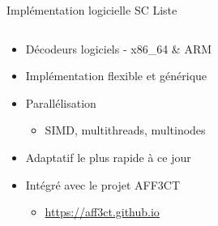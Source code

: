 \documentclass[t,compress,mathserif,12pt,xcolor=dvipsnames]{beamer}
\begin{document}
\begin{frame}[t]{Implémentation logicielle SC Liste}
  \begin{minipage}[t][5.0cm][t]{\textwidth}
    \begin{columns}[T]
      \begin{column}{0.63\textwidth}
        \begin{itemize}
          \item<+-> Décodeurs logiciels - x86\_64 \& ARM
          \item<+-> Implémentation flexible et générique
          \item<+-> Parallélisation
          \begin{itemize}
            \item<3-> SIMD, multithreads, multinodes
          \end{itemize}
          \item<+-> Adaptatif le plus rapide à ce jour
          \item<+-> Intégré avec le projet AFF3CT
          \begin{itemize}
            \item<5-> \url{https://aff3ct.github.io}
          \end{itemize}
        \end{itemize}
      \end{column}
      \begin{column}{0.04\textwidth}


\end{column}
\end{columns}
\end{minipage}
\end{frame}
\end{document}
